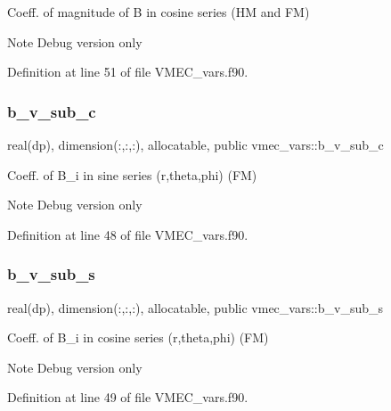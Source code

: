 Coeff. of magnitude of B in cosine series (HM and FM) 

\begin{DoxyNote}{Note}
Debug version only 
\end{DoxyNote}


Definition at line 51 of file V\+M\+E\+C\+\_\+vars.\+f90.

\mbox{\label{namespacevmec__vars_a2e07a2b5bd2384e16e8af8ca4f5b50d6}} 
\subsubsection{\texorpdfstring{b\+\_\+v\+\_\+sub\+\_\+c}{b\_v\_sub\_c}}
{\footnotesize\ttfamily real(dp), dimension(\+:,\+:,\+:), allocatable, public vmec\+\_\+vars\+::b\+\_\+v\+\_\+sub\+\_\+c}



Coeff. of B\+\_\+i in sine series (r,theta,phi) (FM) 

\begin{DoxyNote}{Note}
Debug version only 
\end{DoxyNote}


Definition at line 48 of file V\+M\+E\+C\+\_\+vars.\+f90.

\mbox{\label{namespacevmec__vars_aac5e249f0f14cf1e542f881d1777b730}} 
\subsubsection{\texorpdfstring{b\+\_\+v\+\_\+sub\+\_\+s}{b\_v\_sub\_s}}
{\footnotesize\ttfamily real(dp), dimension(\+:,\+:,\+:), allocatable, public vmec\+\_\+vars\+::b\+\_\+v\+\_\+sub\+\_\+s}



Coeff. of B\+\_\+i in cosine series (r,theta,phi) (FM) 

\begin{DoxyNote}{Note}
Debug version only 
\end{DoxyNote}


Definition at line 49 of file V\+M\+E\+C\+\_\+vars.\+f90.

